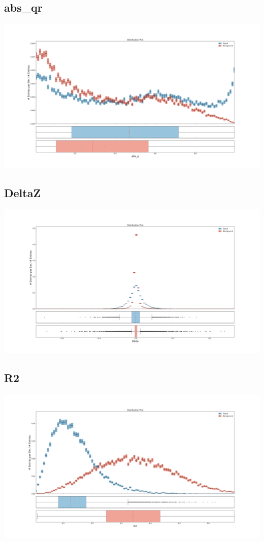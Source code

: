 \documentclass[10pt,a4paper]{article}
\begin{document}
\subsection{abs\_qr}
\begin{center}
\includegraphics[width=1.0\textwidth]{variable_-9124338375614644225.pdf}
\end{center}
\subsection{DeltaZ}
\begin{center}
\includegraphics[width=1.0\textwidth]{variable_-5714228502075652597.pdf}
\end{center}
\subsection{R2}
\begin{center}
\includegraphics[width=1.0\textwidth]{variable_-6277261962849359494.pdf}
\end{center}
\raggedbottom
\pagebreak[0]
\FloatBarrier
\end{document}
